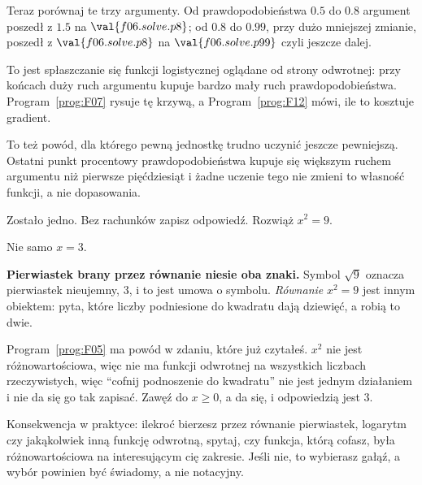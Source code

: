\begin{fr}
Teraz porównaj te trzy argumenty. Od prawdopodobieństwa $\num{0.5}$ do
$\num{0.8}$ argument poszedł z $\num{1.5}$ na $\val{f06.solve.p8}$; od
$\num{0.8}$ do $\num{0.99}$, przy dużo mniejszej zmianie, poszedł z
$\val{f06.solve.p8}$ na $\val{f06.solve.p99}$ \dash{} czyli jeszcze dalej.

To jest spłaszczanie się funkcji logistycznej oglądane od strony odwrotnej:
przy końcach duży ruch argumentu kupuje bardzo mały ruch prawdopodobieństwa.
Program~\ref{prog:F07} rysuje tę krzywą, a Program~\ref{prog:F12} mówi, ile
to kosztuje gradient.

To też powód, dla którego pewną jednostkę trudno uczynić jeszcze pewniejszą.
Ostatni punkt procentowy prawdopodobieństwa kupuje się większym ruchem
argumentu niż pierwsze pięćdziesiąt i żadne uczenie tego nie zmieni \dash{}
to własność funkcji, a nie dopasowania.

Zostało jedno. Bez rachunków \dash{} zapisz odpowiedź. Rozwiąż $x^{2} = 9$.
\dotline
\nextframe
\end{fr}

\begin{fr}
Nie samo $x = 3$.

\begin{trapbox}
\textbf{Pierwiastek brany przez równanie niesie oba znaki.} Symbol $\sqrt{9}$
oznacza pierwiastek nieujemny, $3$, i to jest umowa o symbolu.
\emph{Równanie} $x^{2} = 9$ jest innym obiektem: pyta, które liczby podniesione
do kwadratu dają dziewięć, a robią to dwie.

Program~\ref{prog:F05} ma powód w zdaniu, które już czytałeś. $x^{2}$ nie jest
różnowartościowa, więc nie ma funkcji odwrotnej na wszystkich liczbach
rzeczywistych, więc \enquote{cofnij podnoszenie do kwadratu} nie jest jednym
działaniem i nie da się go tak zapisać. Zawęź do $x \ge 0$, a da się, i
odpowiedzią jest $3$.

Konsekwencja w praktyce: ilekroć bierzesz przez równanie pierwiastek,
logarytm czy jakąkolwiek inną funkcję odwrotną, spytaj, czy funkcja, którą
cofasz, była różnowartościowa na interesującym cię zakresie. Jeśli nie, to
wybierasz gałąź, a wybór powinien być świadomy, a nie notacyjny.
\end{trapbox}
\end{fr}


